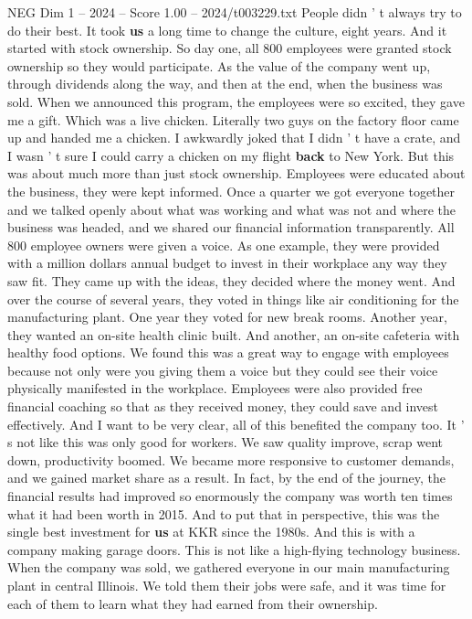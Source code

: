 \begin{textsample}{NEG Dim 1 – 2024 – Score 1.00 – 2024/t003229.txt}
People didn ' t always try to do their best.
It took \textbf{us} a long time to change the culture, eight years.
And it started with stock ownership.
So day one, all 800 employees were granted stock ownership so they would participate.
As the value of the company went up, through dividends along the way, and then at the end, when the business was sold.
When we announced this program, the employees were so excited, they gave me a gift.
Which was a live chicken.
Literally two guys on the factory floor came up and handed me a chicken.
I awkwardly joked that I didn ' t have a crate, and I wasn ' t sure I could carry a chicken on my flight \textbf{back} to New York.
But this was about much more than just stock ownership.
Employees were educated about the business, they were kept informed.
Once a quarter we got everyone together and we talked openly about what was working and what was not and where the business was headed, and we shared our financial information transparently.
All 800 employee owners were given a voice.
As one example, they were provided with a million dollars annual budget to invest in their workplace any way they saw fit.
They came up with the ideas, they decided where the money went.
And over the course of several years, they voted in things like air conditioning for the manufacturing plant.
One year they voted for new break rooms.
Another year, they wanted an on-site health clinic built.
And another, an on-site cafeteria with healthy food options.
We found this was a great way to engage with employees because not only were you giving them a voice but they could see their voice physically manifested in the workplace.
Employees were also provided free financial coaching so that as they received money, they could save and invest effectively.
And I want to be very clear, all of this benefited the company too.
It ' s not like this was only good for workers.
We saw quality improve, scrap went down, productivity boomed.
We became more responsive to customer demands, and we gained market share as a result.
In fact, by the end of the journey, the financial results had improved so enormously the company was worth ten times what it had been worth in 2015.
And to put that in perspective, this was the single best investment for \textbf{us} at KKR since the 1980s.
And this is with a company making garage doors.
This is not like a high-flying technology business.
When the company was sold, we gathered everyone in our main manufacturing plant in central Illinois.
We told them their jobs were safe, and it was time for each of them to learn what they had earned from their ownership.

\end{textsample}
